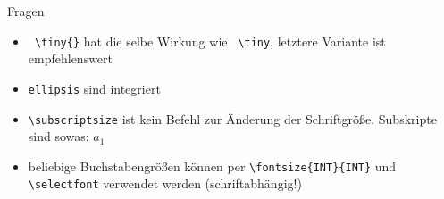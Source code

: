 
\begin{frame}[fragile]{Fragen}
    \begin{itemize}
          \item \lstinline| \tiny{}| hat die selbe Wirkung wie \lstinline| \tiny|, letztere Variante ist empfehlenswert
          \item \texttt{ellipsis} sind integriert
          \item \lstinline|\subscriptsize| ist kein Befehl zur Änderung der Schriftgröße. Subskripte sind sowas: $a_{1}$
          \item beliebige Buchstabengrößen können per \lstinline|\fontsize{INT}{INT}| und \lstinline|\selectfont| verwendet werden (schriftabhängig!)
    \end{itemize}
\end{frame}

